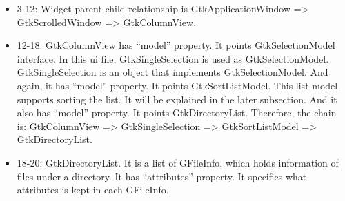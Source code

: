 \begin{itemize}
\tightlist
\item
  3-12: Widget parent-child relationship is GtkApplicationWindow
  =\textgreater{} GtkScrolledWindow =\textgreater{} GtkColumnView.
\item
  12-18: GtkColumnView has ``model'' property. It points
  GtkSelectionModel interface. In this ui file, GtkSingleSelection is
  used as GtkSelectionModel. GtkSingleSelection is an object that
  implements GtkSelectionModel. And again, it has ``model'' property. It
  points GtkSortListModel. This list model supports sorting the list. It
  will be explained in the later subsection. And it also has ``model''
  property. It points GtkDirectoryList. Therefore, the chain is:
  GtkColumnView =\textgreater{} GtkSingleSelection =\textgreater{}
  GtkSortListModel =\textgreater{} GtkDirectoryList.
\item
  18-20: GtkDirectoryList. It is a list of GFileInfo, which holds
  information of files under a directory. It has ``attributes''
  property. It specifies what attributes is kept in each GFileInfo.


\end{itemize}
